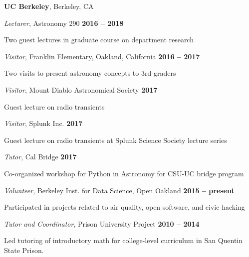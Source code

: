 \documentclass[11pt]{article}
\begin{document}
\textbf{UC Berkeley}, Berkeley, CA
\begin{outerlist}

\item[] \textit{Lecturer}, Astronomy 290
    \hfill \textbf{2016 -- 2018}
    \begin{innerlist}
        \item Two guest lectures in graduate course on department research
    \end{innerlist}

\item[] \textit{Visitor}, Franklin Elementary, Oakland, California
    \hfill \textbf{2016 -- 2017}
    \begin{innerlist}
        \item Two visits to present astronomy concepts to 3rd graders
    \end{innerlist}

\item[] \textit{Visitor}, Mount Diablo Astronomical Society
    \hfill \textbf{2017}
    \begin{innerlist}
        \item Guest lecture on radio transients
    \end{innerlist}

\item[] \textit{Visitor}, Splunk Inc.
    \hfill \textbf{2017}
    \begin{innerlist}
        \item Guest lecture on radio transients at Splunk Science Society lecture series
    \end{innerlist}

\item[] \textit{Tutor}, Cal Bridge
    \hfill \textbf{2017}
    \begin{innerlist}
        \item Co-organized workshop for Python in Astronomy for CSU-UC bridge program
    \end{innerlist}

\item[] \textit{Volunteer}, Berkeley Inst. for Data Science, Open Oakland
    \hfill \textbf{2015 -- present}
    \begin{innerlist}
        \item Participated in projects related to air quality, open software, and civic hacking
    \end{innerlist}

\item[] \textit{Tutor and Coordinator}, Prison University Project
    \hfill \textbf{2010 -- 2014}
    \begin{innerlist}
        \item Led tutoring of introductory math for college-level curriculum in San Quentin State Prison.
    \end{innerlist}


\end{outerlist}
\end{document}
